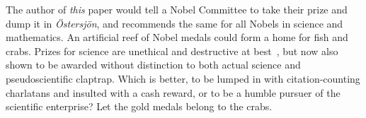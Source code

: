\documentclass[9pt,technote]{IEEEtran}
\begin{document}
The author of {\em{this}} paper would tell a Nobel Committee to take
their prize and dump it in {\em{Östersjön}}, and recommends the same
for all Nobels in science and mathematics. An artificial reef of Nobel
medals could form a home for fish and crabs. Prizes for science are
unethical and destructive at
best~\cite{kohn1993punished,sciencemag:nobelbad}, but now also shown
to be awarded without distinction to both actual science and
pseudoscientific claptrap. Which is better, to be lumped in with
citation-counting charlatans and insulted with a cash reward, or to be
a humble pursuer of the scientific enterprise? Let the gold medals
belong to the crabs.

{}

\end{document}
